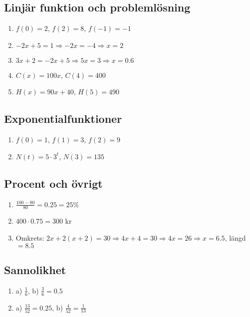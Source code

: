\documentclass[a4paper,11pt]{article}
\begin{document}
\subsection*{Linjär funktion och problemlösning}
\begin{enumerate}[label=\textbf{3.\arabic*.}]
    \item $f(0) = 2$, $f(2) = 8$, $f(-1) = -1$
    \item $-2x + 5 = 1 \Rightarrow -2x = -4 \Rightarrow x = 2$
    \item $3x + 2 = -2x + 5 \Rightarrow 5x = 3 \Rightarrow x = 0.6$
    \item $C(x) = 100x$, $C(4) = 400$
    \item $H(x) = 90x + 40$, $H(5) = 490$
\end{enumerate}

\subsection*{Exponentialfunktioner}
\begin{enumerate}[label=\textbf{4.\arabic*.}]
    \item $f(0) = 1$, $f(1) = 3$, $f(2) = 9$
    \item $N(t) = 5 \cdot 3^t$, $N(3) = 135$
\end{enumerate}

\subsection*{Procent och övrigt}
\begin{enumerate}[label=\textbf{5.\arabic*.}]
    \item $\frac{100-80}{80} = 0.25 = 25\%$
    \item $400 \cdot 0.75 = 300$ kr
    \item Omkrets: $2x + 2(x+2) = 30 \Rightarrow 4x + 4 = 30 \Rightarrow 4x = 26 \Rightarrow x = 6.5$, längd $= 8.5$
\end{enumerate}

\subsection*{Sannolikhet}
\begin{enumerate}[label=\textbf{6.\arabic*.}]
    \item a) $\frac{1}{6}$, b) $\frac{3}{6} = 0.5$
    \item a) $\frac{13}{52} = 0.25$, b) $\frac{4}{52} = \frac{1}{13}$
\end{enumerate}
\end{document}
